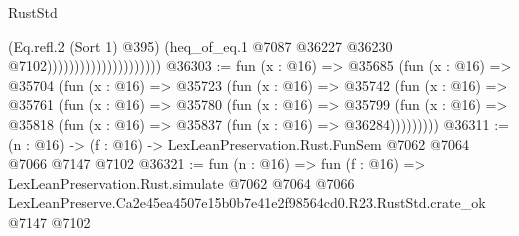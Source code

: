 \begin{lexlean}{RustStd}
\begin{coremodule}
                                            (Eq.refl.{2} (Sort 1) @395)
                                            (heq_of_eq.{1}
                                              @7087
                                              @36227
                                              @36230
                                              @7102)))))))))))))))))))))
@36303 := fun (x : @16) =>
  @35685
    (fun (x : @16) =>
    @35704
      (fun (x : @16) =>
      @35723
        (fun (x : @16) =>
        @35742
          (fun (x : @16) =>
          @35761
            (fun (x : @16) =>
            @35780
              (fun (x : @16) =>
              @35799
                (fun (x : @16) => @35818 (fun (x : @16) => @35837 (fun (x : @16) => @36284)))))))))
@36311 := (n : @16) -> (f : @16) -> LexLeanPreservation.Rust.FunSem @7062 @7064 @7066 @7147 @7102
@36321 := fun (n : @16) =>
  fun (f : @16) =>
  LexLeanPreservation.Rust.simulate
    @7062
    @7064
    @7066
    LexLeanPreserve.Ca2e45ea4507e15b0b7e41e2f98564cd0.R23.RustStd.crate_ok
    @7147
    @7102
\end{coremodule}
\end{lexlean}
